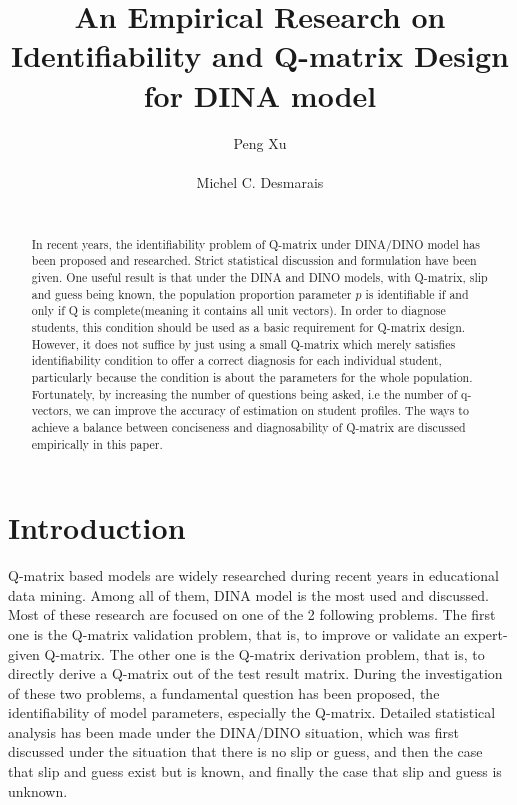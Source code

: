 \documentclass{edm_template}
\begin{document}
\title{An Empirical Research on Identifiability and Q-matrix Design for DINA model}
\author{
\alignauthor
Peng Xu\\
       \\
\alignauthor
Michel C. Desmarais\\
       \\
}
\maketitle

\begin{abstract}
In recent years, the identifiability problem of Q-matrix under DINA/DINO model has been proposed and researched. Strict statistical discussion and formulation have been given. One useful result is that under the DINA and DINO models, with Q-matrix, slip and guess being known, the population proportion parameter $p$ is identifiable if and only if Q is complete(meaning it contains all unit vectors). In order to diagnose students, this condition should be used as a basic requirement for Q-matrix design. However, it does not suffice by just using a small Q-matrix which merely satisfies identifiability condition to offer a correct diagnosis for each individual student, particularly because the condition is about the parameters for the whole population. Fortunately, by increasing the number of questions being asked, i.e the number of q-vectors, we can improve the accuracy of estimation on student profiles. The ways to achieve a balance between conciseness and diagnosability of Q-matrix are discussed empirically in this paper.  
\end{abstract}
\section{Introduction}
Q-matrix based models are widely researched during recent years in educational data mining. Among all of them, DINA model is the most used and discussed. Most of these research are focused on one of the 2 following problems. The first one is the Q-matrix validation problem, that is, to improve or validate an expert-given Q-matrix\cite{de2015general, chiu2013statistical, desmarais2013matrix}. The other one is the Q-matrix derivation problem, that is, to directly derive a Q-matrix out of the test result matrix\cite{barnes2010novel, liu2012data, desmarais2015combining, xu2016boosted}. During the investigation of these two problems, a fundamental question has been proposed, the identifiability of model parameters, especially the Q-matrix. Detailed statistical analysis has been made under the DINA/DINO situation, which was first discussed under the situation that there is no slip or guess, and then the case that slip and guess exist but is known, and finally the case that slip and guess is unknown. 
\end{document}
